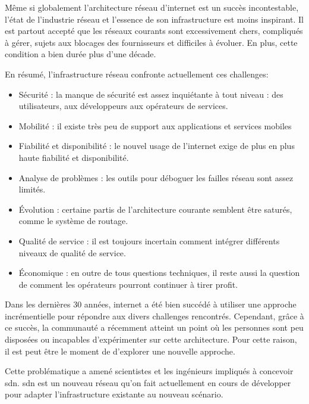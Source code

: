 Même si globalement l'architecture réseau d'internet est un succès incontestable, l'état de l'industrie réseau et l'essence de son infrastructure est moins inspirant. Il est partout accepté que les réseaux courants sont excessivement chers, compliqués à gérer, sujets aux blocages des fournisseurs et difficiles à évoluer. En plus, cette condition a bien durée plus d'une décade. \cite{fabricIntro}



En résumé, l'infrastructure réseau confronte actuellement ces challenges:
\begin{itemize}
\item Sécurité : la manque de sécurité est assez inquiétante à tout niveau : des utilisateurs, aux développeurs aux opérateurs de services.
\item Mobilité : il existe très peu de support aux applications et services mobiles
\item Fiabilité et disponibilité : le nouvel usage de l'internet exige de plus en plus haute fiabilité et disponibilité.
\item Analyse de problèmes : les outils pour déboguer les failles réseau sont assez limités.
\item Évolution : certaine partis de l'architecture courante semblent être saturés, comme le système de routage.
\item Qualité de service : il est toujours incertain comment intégrer différents niveaux de qualité de service.
\item Économique : en outre de tous questions techniques, il reste aussi la question de comment les opérateurs pourront continuer à tirer profit.
\end{itemize}
\cite{InernetCleanSlateDesignIntro}

Dans les dernières 30 années, internet a été bien succédé à utiliser une approche incrémentielle pour répondre aux divers challenges rencontrés. Cependant, grâce à ce succès, la communauté a récemment atteint un point où les personnes sont peu disposées ou incapables d'expérimenter sur cette architecture.  Pour cette raison, il est peut être le moment de d'explorer une nouvelle approche. \cite{InernetCleanSlateDesignApproach}



Cette problématique a amené scientistes et les ingénieurs impliqués à concevoir \gls{sdn}. \gls{sdn} est un nouveau  réseau qu'on fait actuellement en cours de développer pour adapter l'infrastructure existante au nouveau scénario.


